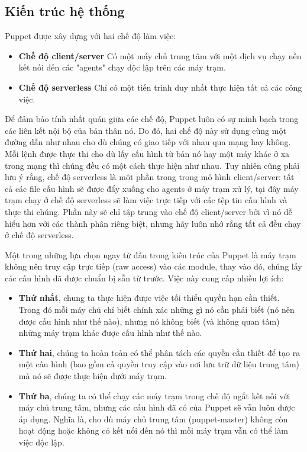 \subsection{Kiến trúc hệ thống}

Puppet được xây dựng với hai chế độ làm việc:

\begin{itemize}
\item \textbf{Chế độ client/server} Có một máy chủ trung tâm với một dịch vụ chạy nền kết nối đến các "agents" chạy độc lập trên các máy trạm.

\item \textbf{Chế độ serverless} Chỉ có một tiến trình duy nhất thực hiện tất cả các công việc.
\end{itemize}

Để đảm bảo tính nhất quán giữa các chế độ, Puppet luôn có sự minh bạch trong các liên kết nội bộ của bản thân nó. Do đó, hai chế độ này sử dụng cùng một đường dẫn như nhau cho dù chúng có giao tiếp với nhau qua mạng hay không. Mỗi lệnh được thực thi cho dù lấy cấu hình từ bản nó hay một máy khác ở xa trong mạng thì chúng đều có một cách thực hiện như nhau. Tuy nhiên cũng phải lưu ý rằng, chế độ serverless là một phần trong trong mô hình client/server: tất cả các file cấu hình sẽ được đẩy xuống cho agents ở máy trạm xử lý, tại đây máy trạm chạy ở chế độ serverless sẽ làm việc trực tiếp với các tệp tin cấu hình và thực thi chúng. Phần này sẽ chỉ tập trung vào chế độ client/server bởi vì nó dễ hiểu hơn với các thành phân riêng biệt, nhưng hãy luôn nhớ rằng tất cả đều chạy ở chế độ serverless.

Một trong những lựa chọn ngay từ đầu trong kiến trúc của Puppet là máy trạm không nên truy cập trực tiếp (raw access) vào các module, thay vào đó, chúng lấy các cấu hình đã được chuẩn bị sẵn từ trước. Việc này cung cấp nhiều lợi ích:

\begin{itemize}
\item \textbf{Thứ nhất}, chung ta thực hiện được việc tối thiểu quyền hạn cần thiết. Trong đó mỗi máy chủ chỉ biết chính xác những gì nó cần phải biết (nó nên được cấu hình như thế nào), nhưng nó không biết (và không quan tâm) những máy trạm khác được cấu hình như thế nào.

\item \textbf{Thứ hai}, chúng ta hoàn toàn có thể phân tách các quyền cần thiết để tạo ra một cấu hình (bao gồm cả quyền truy cập vào nơi lưu trữ dữ liệu trung tâm) mà nó sẽ được thực hiện dưới máy trạm.

\item \textbf{Thứ ba}, chúng ta có thể chạy các máy trạm trong chế độ ngắt kết nối với máy chủ trung tâm, nhưng các cấu hình đã có của Puppet sẽ vẫn luôn được áp dụng. Nghĩa là, cho dù máy chủ trung tâm (puppet-master) không còn hoạt động hoặc không có kết nối đến nó thì mỗi máy trạm vẫn có thể làm việc độc lập.

\end{itemize}

